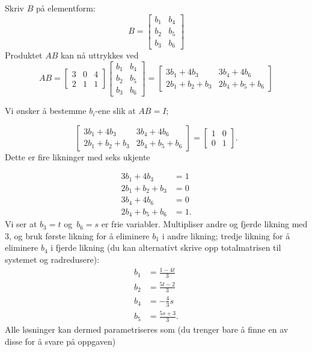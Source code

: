 \documentclass[titlepage,a4paper,12pt,norsk]{IMFeksamen}
\newcommand{\0}{\V{0}}
\begin{document}
\begin{oppgave}
Skriv $B$ på elementform:
\[
B=\begin{bmatrix}
b_1 & b_4\\
b_2 & b_5\\
b_3 & b_6
\end{bmatrix}
\]
Produktet $AB$ kan nå uttrykkes ved 
\[
AB=
\begin{bmatrix}
3 & 0 & 4 \\
2 & 1 & 1
\end{bmatrix}
\begin{bmatrix}
b_1 & b_4\\
b_2 & b_5\\
b_3 & b_6
\end{bmatrix}=
\begin{bmatrix}
3b_1+4b_3 & 3b_4+4b_6\\
2b_1+b_2+b_3 & 2b_4+b_5+b_6
\end{bmatrix}
\]

Vi ønsker å bestemme $b_i$-ene slik at $AB=I$;

\[
\begin{bmatrix}
3b_1+4b_3 & 3b_4+4b_6\\
2b_1+b_2+b_3 & 2b_4+b_5+b_6
\end{bmatrix}
=
\begin{bmatrix}
1 & 0\\
0 & 1
\end{bmatrix}.
\]
Dette er fire likninger med seks ukjente

\begin{align*}
3b_1+4b_3&=1\\
2b_1+b_2+b_3&=0\\
3b_4+4b_6&=0\\
2b_4+b_5+b_6&=1.
\end{align*}
Vi ser at $b_3=t$ og~$b_6=s$ er frie variabler. Multipliser andre og fjerde likning med $3$, og bruk første likning for å eliminere $b_1$ i andre likning; tredje likning for å eliminere $b_4$ i fjerde likning (du kan alternativt skrive opp totalmatrisen til systemet og radredusere):
\begin{align*}
b_1&=\frac{1-4t}{3}\\
b_2&=\frac{5t-2}{3}\\
b_4&=-\frac{4}{3}s\\
b_5&=\frac{5s+3}{3}.
\end{align*}
Alle løsninger kan dermed parametriseres som (du trenger bare å finne en av disse for å svare på oppgaven)


\end{oppgave}
\end{document}
